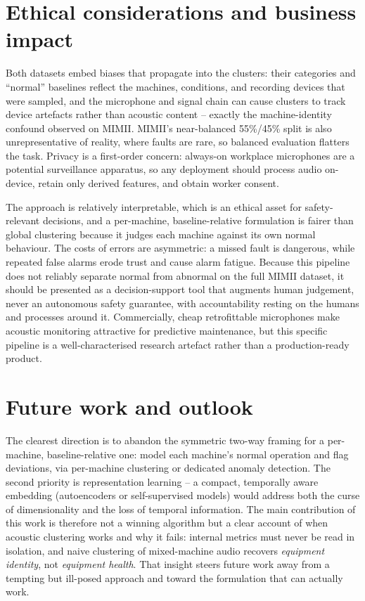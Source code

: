 \documentclass[runningheads,a4paper,11pt]{report}
\begin{document}
\section{Ethical considerations and business impact}
\label{section:ethics}

Both datasets embed biases that propagate into the clusters: their categories and ``normal'' baselines reflect the machines, conditions, and recording devices that were sampled, and the microphone and signal chain can cause clusters to track device artefacts rather than acoustic content -- exactly the machine-identity confound observed on MIMII. MIMII's near-balanced 55\%/45\% split is also unrepresentative of reality, where faults are rare, so balanced evaluation flatters the task. Privacy is a first-order concern: always-on workplace microphones are a potential surveillance apparatus, so any deployment should process audio on-device, retain only derived features, and obtain worker consent.

The approach is relatively interpretable, which is an ethical asset for safety-relevant decisions, and a per-machine, baseline-relative formulation is fairer than global clustering because it judges each machine against its own normal behaviour. The costs of errors are asymmetric: a missed fault is dangerous, while repeated false alarms erode trust and cause alarm fatigue. Because this pipeline does not reliably separate normal from abnormal on the full MIMII dataset, it should be presented as a decision-support tool that augments human judgement, never an autonomous safety guarantee, with accountability resting on the humans and processes around it. Commercially, cheap retrofittable microphones make acoustic monitoring attractive for predictive maintenance, but this specific pipeline is a well-characterised research artefact rather than a production-ready product.

\section{Future work and outlook}
\label{section:futureWork}

The clearest direction is to abandon the symmetric two-way framing for a per-machine, baseline-relative one: model each machine's normal operation and flag deviations, via per-machine clustering or dedicated anomaly detection. The second priority is representation learning -- a compact, temporally aware embedding (autoencoders or self-supervised models) would address both the curse of dimensionality and the loss of temporal information. The main contribution of this work is therefore not a winning algorithm but a clear account of when acoustic clustering works and why it fails: internal metrics must never be read in isolation, and naive clustering of mixed-machine audio recovers \emph{equipment identity}, not \emph{equipment health}. That insight steers future work away from a tempting but ill-posed approach and toward the formulation that can actually work.










\end{document}

